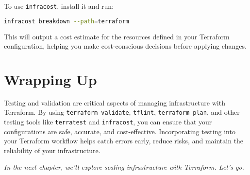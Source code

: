To use \texttt{infracost}, install it and run:

\begin{lstlisting}[language=bash]
infracost breakdown --path=terraform
\end{lstlisting}

This will output a cost estimate for the resources defined in your Terraform configuration, helping you make cost-conscious decisions before applying changes.

\section{Wrapping Up}

Testing and validation are critical aspects of managing infrastructure with Terraform. By using \texttt{terraform validate}, \texttt{tflint}, \texttt{terraform plan}, and other testing tools like \texttt{terratest} and \texttt{infracost}, you can ensure that your configurations are safe, accurate, and cost-effective. Incorporating testing into your Terraform workflow helps catch errors early, reduce risks, and maintain the reliability of your infrastructure.

\vspace{1em}

\textit{In the next chapter, we'll explore scaling infrastructure with Terraform. Let's go.}
